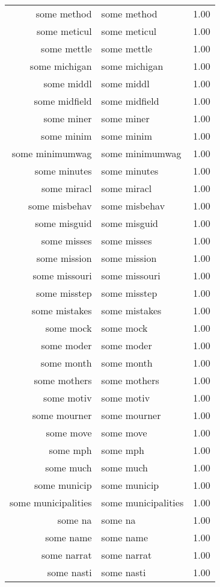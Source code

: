 \begin{table}[ht]
\begin{tabular}{rlr}
  some method & some method & 1.00 \\ 
  some meticul & some meticul & 1.00 \\ 
  some mettle & some mettle & 1.00 \\ 
  some michigan & some michigan & 1.00 \\ 
  some middl & some middl & 1.00 \\ 
  some midfield & some midfield & 1.00 \\ 
  some miner & some miner & 1.00 \\ 
  some minim & some minim & 1.00 \\ 
  some minimumwag & some minimumwag & 1.00 \\ 
  some minutes & some minutes & 1.00 \\ 
  some miracl & some miracl & 1.00 \\ 
  some misbehav & some misbehav & 1.00 \\ 
  some misguid & some misguid & 1.00 \\ 
  some misses & some misses & 1.00 \\ 
  some mission & some mission & 1.00 \\ 
  some missouri & some missouri & 1.00 \\ 
  some misstep & some misstep & 1.00 \\ 
  some mistakes & some mistakes & 1.00 \\ 
  some mock & some mock & 1.00 \\ 
  some moder & some moder & 1.00 \\ 
  some month & some month & 1.00 \\ 
  some mothers & some mothers & 1.00 \\ 
  some motiv & some motiv & 1.00 \\ 
  some mourner & some mourner & 1.00 \\ 
  some move & some move & 1.00 \\ 
  some mph & some mph & 1.00 \\ 
  some much & some much & 1.00 \\ 
  some municip & some municip & 1.00 \\ 
  some municipalities & some municipalities & 1.00 \\ 
  some na & some na & 1.00 \\ 
  some name & some name & 1.00 \\ 
  some narrat & some narrat & 1.00 \\ 
  some nasti & some nasti & 1.00 \\ 

\end{tabular}
\end{table}
